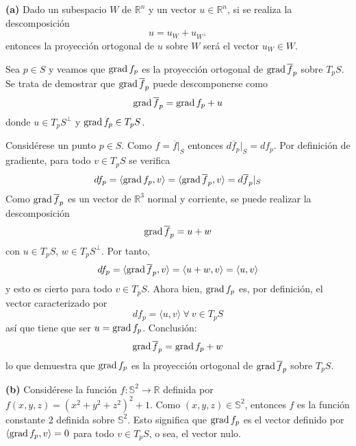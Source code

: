 \documentclass[12pt]{report}
\newcommand{\R}{\mathbb R}
\begin{document}
\vspace{2mm}
\textbf{(a)} Dado un subespacio $W$ de $\R^n$ y un vector $u \in \R^n$, si se realiza la descomposición
\[u = u_W + u_{W^\perp}\]
entonces la proyección ortogonal de $u$ sobre $W$ será el vector $u_W \in W$. 

\vspace{2mm}
Sea $p \in S$ y veamos que $\textup{grad} \, f_p$ es la proyección ortogonal de $\textup{grad} \, \overline{f}_p$ sobre $T_pS$. Se trata de demostrar que $\textup{grad} \, \overline{f}_p$ puede descomponerse como
\[\textup{grad} \, \overline{f}_p = \textup{grad} \, f_p + u\]
donde $u \in T_pS^\perp$ y $\textup{grad} \, f_p \in T_pS$.

\vspace{2mm}
Considérese un punto $p \in S$. Como $f = \overline{f} |_S$ entonces $d\overline{f}_p|_S = df_p$. Por definición de gradiente, para todo $v \in T_pS$ se verifica 
\[df_p = \langle \textup{grad} \, f_p,v \rangle = \langle \textup{grad} \, \overline{f}_p,v \rangle = d\overline{f}_p|_S \]
Como $\textup{grad} \, \overline{f}_p$ es un vector de $\R^3$ normal y corriente, se puede realizar la descomposición
\[\textup{grad} \, \overline{f}_p = u + w\]
con $u \in T_pS$, $w \in T_pS^\perp$. Por tanto,
\[df_p = \langle \textup{grad} \, \overline{f}_p,v \rangle = \langle u+w,v \rangle = \langle u,v \rangle\]
y esto es cierto para todo $v \in T_pS$. Ahora bien, $\textup{grad} \, f_p$ es, por definición, el vector caracterizado por 
\[df_p = \langle u,v \rangle \ \forall \ v \in T_pS\]
así que tiene que ser $u = \textup{grad} \, f_p$. Conclusión:
\[\textup{grad} \, \overline{f}_p = \textup{grad} \, f_p + w\]
lo que demuestra que $\textup{grad} \, f_p$ es la proyección ortogonal de $\textup{grad} \, \overline{f}_p$ sobre $T_pS$.

\vspace{2mm}
\textbf{(b)} Considérese la función $f \colon \mathbb{S}^2 \to \R$ definida por $f(x,y,z) = (x^2+y^2+z^2)^2+1$. Como $(x,y,z) \in \mathbb{S}^2$, entonces $f$ es la función constante $2$ definida sobre $\mathbb{S}^2$. Esto significa que $\textup{grad} \, f_p$ es el vector definido por $\langle \textup{grad} \, f_p, v \rangle = 0$ para todo $v \in T_pS$, o sea, el vector nulo.
\[\]
\end{document}
